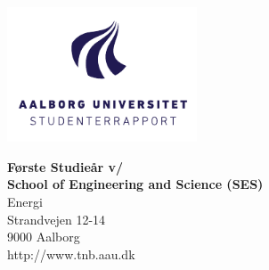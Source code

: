 

{}
\thispagestyle{empty}

\begin{minipage}[t]{0.48\textwidth}
\vspace*{-25pt}			%
\includegraphics[height=4cm]{billeder/AAU-logo-stud-DK-RGB}
\end{minipage}
\hfill
\begin{minipage}[t]{0.48\textwidth}
{\small 
\textbf{Første Studieår v/ }\\
\textbf{School of Engineering and Science (SES)}  \\
Energi \\
Strandvejen 12-14 \\
9000 Aalborg \\
http://www.tnb.aau.dk}
\end{minipage}

\vspace*{1cm}

